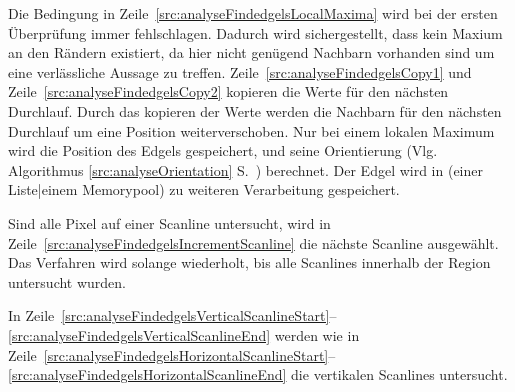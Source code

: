 Die Bedingung in Zeile~\ref{src:analyseFindedgelsLocalMaxima} wird bei der ersten Überprüfung immer fehlschlagen.
 Dadurch wird sichergestellt, dass kein Maxium an den Rändern existiert, da hier nicht genügend Nachbarn vorhanden sind
 um eine verlässliche Aussage zu treffen. Zeile~\ref{src:analyseFindedgelsCopy1} und
 Zeile~\ref{src:analyseFindedgelsCopy2} kopieren die Werte für den nächsten Durchlauf. Durch das kopieren der Werte
 werden die Nachbarn für den nächsten Durchlauf um eine Position weiterverschoben. Nur bei einem lokalen Maximum wird
 die Position des Edgels gespeichert, und seine Orientierung (Vlg. Algorithmus \ref{src:analyseOrientation}
 S.~\pageref{src:analyseOrientation}) berechnet. Der Edgel wird in (einer Liste|einem Memorypool) zu weiteren
 Verarbeitung gespeichert.

Sind alle Pixel auf einer Scanline untersucht, wird in Zeile~\ref{src:analyseFindedgelsIncrementScanline} die nächste
 Scanline ausgewählt. Das Verfahren wird solange wiederholt, bis alle Scanlines innerhalb der Region untersucht wurden.

In Zeile~\ref{src:analyseFindedgelsVerticalScanlineStart}--\ref{src:analyseFindedgelsVerticalScanlineEnd} werden wie in
 Zeile~\ref{src:analyseFindedgelsHorizontalScanlineStart}--\ref{src:analyseFindedgelsHorizontalScanlineEnd} die
 vertikalen Scanlines untersucht.





